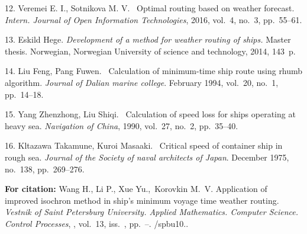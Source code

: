 {{12}. Veremei E. I., Sotnikova M. V. ~Optimal routing based on
weather forecast. \textit{ Intern. Journal of Open Information
Technologies}, 2016, vol.~4, no.~3, pp.~55--61.

{13}. Eskild Hege. \textit{Development of a method for weather
routing of ships.} Master thesis. Norwegian, Norwegian University
of science and technology, 2014, 143~p.

{14}. Liu Feng, Pang Fuwen. ~Calculation of minimum-time ship
route using rhumb algorithm. \textit{Journal of Dalian marine
college}. February 1994, vol.~20, no.~1, pp.~14--18.

{15}. Yang Zhenzhong, Liu Shiqi. ~Calculation of speed loss for
ships operating at heavy sea. \textit{Navigation of China},  1990,
vol.~27, no.~2, pp.~35--40.

{16}. Kltazawa Takamune, Kuroi Masaaki. ~Critical speed of
container ship in rough sea. \textit{ Journal of the$ $ Society of
naval architects of Japan}. December 1975, no.~138, pp.~269--276.






\vskip 2mm

{\bf For citation:}  Wang H., Li P., Xue Yu.,~Korovkin M.~V.
Application of improved isochron method  in ship's minimum voyage
time weather routing. {\it Vestnik of Saint Petersburg University.
Applied Mathematics. Computer Science. Control Processes},
\issueyear, vol.~13, iss.~\issuenum,
pp.~\pageref{p6}--\pageref{p6e}.
\doivyp/spbu10.\issueyear.


}
